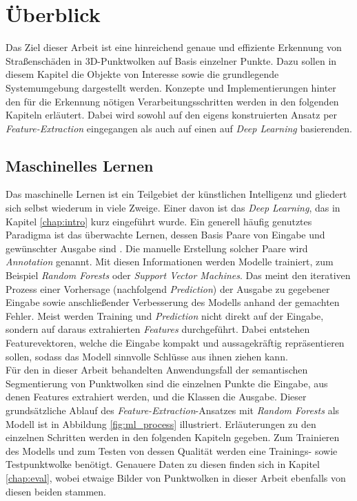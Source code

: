 
\chapter{Überblick}
\label{chap:overview}

Das Ziel dieser Arbeit ist eine hinreichend genaue und effiziente Erkennung von Straßenschäden in 3D-Punktwolken auf Basis einzelner Punkte. Dazu sollen in diesem Kapitel die Objekte von Interesse sowie die grundlegende Systemumgebung dargestellt werden. Konzepte und Implementierungen hinter den für die Erkennung nötigen Verarbeitungsschritten werden in den folgenden Kapiteln erläutert. Dabei wird sowohl auf den eigens konstruierten Ansatz per \textit{Feature-Extraction} eingegangen als auch auf einen auf \textit{Deep Learning} basierenden.

\section{Maschinelles Lernen}

Das maschinelle Lernen ist ein Teilgebiet der künstlichen Intelligenz und gliedert sich selbst wiederum in viele Zweige. Einer davon ist das \textit{Deep Learning}, das in Kapitel \ref{chap:intro} kurz eingeführt wurde. Ein generell häufig genutztes Paradigma ist das überwachte Lernen, dessen Basis Paare von Eingabe und gewünschter Ausgabe sind \citep{Jung-2020}. Die manuelle Erstellung solcher Paare wird \textit{Annotation} genannt. Mit diesen Informationen werden Modelle trainiert, zum Beispiel \textit{Random Forests} oder \textit{Support Vector Machines}. Das meint den iterativen Prozess einer Vorhersage (nachfolgend \textit{Prediction}) der Ausgabe zu gegebener Eingabe sowie anschließender Verbesserung des Modells anhand der gemachten Fehler. Meist werden Training und \textit{Prediction} nicht direkt auf der Eingabe, sondern auf daraus extrahierten \textit{Features} durchgeführt. Dabei entstehen Featurevektoren, welche die Eingabe kompakt und aussagekräftig repräsentieren sollen, sodass das Modell sinnvolle Schlüsse aus ihnen ziehen kann. \\
Für den in dieser Arbeit behandelten Anwendungsfall der semantischen Segmentierung von Punktwolken sind die einzelnen Punkte die Eingabe, aus denen Features extrahiert werden, und die Klassen die Ausgabe. Dieser grundsätzliche Ablauf des \textit{Feature-Extraction}-Ansatzes mit \textit{Random Forests} als Modell ist in Abbildung \ref{fig:ml_process} illustriert. Erläuterungen zu den einzelnen Schritten werden in den folgenden Kapiteln gegeben. Zum Trainieren des Modells und zum Testen von dessen Qualität werden eine Trainings- sowie Testpunktwolke benötigt. Genauere Daten zu diesen finden sich in Kapitel \ref{chap:eval}, wobei etwaige Bilder von Punktwolken in dieser Arbeit ebenfalls von diesen beiden stammen.

